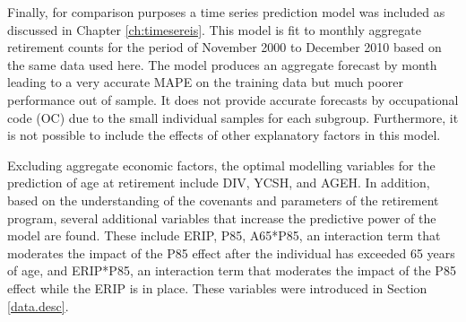 Finally, for comparison purposes a time series prediction model was included as discussed in Chapter \ref{ch:timesereis}. This model is fit to monthly aggregate retirement counts for the period of November 2000 to December 2010 based on the same data used here. The model produces an aggregate forecast by month leading to a very accurate MAPE on the training data but much poorer performance out of sample. It does not provide accurate forecasts by occupational code (OC) due to the small individual samples for each subgroup. Furthermore, it is not possible to include the effects of other explanatory factors in this model.




Excluding aggregate economic factors, the optimal modelling variables for the prediction of age at retirement include DIV, YCSH, and AGEH.  In addition, based on the understanding of the covenants and parameters of the retirement program, several additional variables  that increase the predictive power of the model are found. These include ERIP, P85, A65*P85, an interaction term that moderates the impact of the P85 effect after the individual has exceeded 65 years of age, and  ERIP*P85, an interaction term that moderates the impact of the P85 effect while the ERIP is in place.  These variables were introduced in Section \ref{data.desc}.

